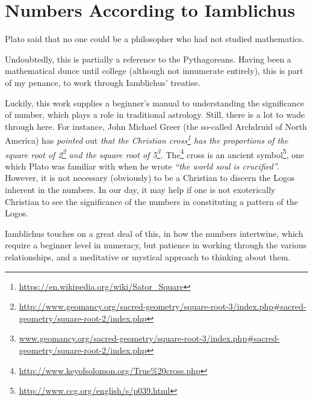 \section{Numbers According to Iamblichus}

Plato said that no one could be a philosopher who had not studied mathematics.

Undoubtedly, this is partially a reference to the Pythagoreans. Having been a mathematical dunce until college (although not innumerate entirely), this is part of my penance, to work through Iamblichus' treatise.

Luckily, this work supplies a beginner's manual to understanding the significance of number, which plays a role in traditional astrology. Still, there is a lot to wade through here. For instance, John Michael Greer (the so-called Archdruid of North America) has \emph{pointed} out \emph{that the Christian cross\footnote{\url{https://en.wikipedia.org/wiki/Sator\_Square}} has the proportions of the square root of 2\footnote{\url{http://www.geomancy.org/sacred-geometry/square-root-3/index.php\#sacred-geometry/square-root-2/index.php}} and the square root of 5\footnote{\url{www.geomancy.org/sacred-geometry/square-root-3/index.php\#sacred-geometry/square-root-2/index.php}}.} The\footnote{\url{http://www.keyofsolomon.org/True\%20cross.php}} cross is an ancient symbol\footnote{\url{http://www.ccg.org/english/s/p039.html}}, one which Plato was familiar with when he wrote \emph{``the world soul is crucified''.} However, it is not necessary (obviously) to be a Christian to discern the Logos inherent in the numbers. In our day, it may help if one is not exoterically Christian to see the significance of the numbers in constituting a pattern of the Logos.

Iamblichus touches on a great deal of this, in how the numbers intertwine, which require a beginner level in numeracy, but patience in working through the various relationships, and a meditative or mystical approach to thinking about them.

